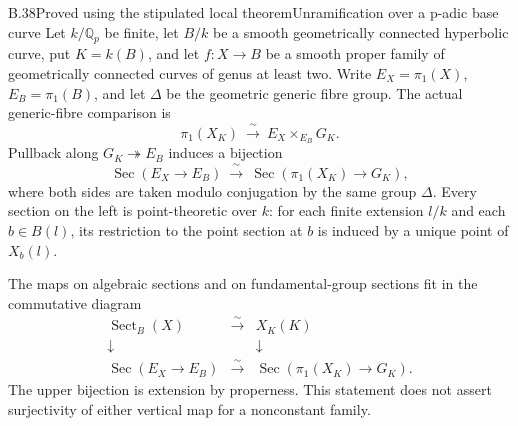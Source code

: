 \begin{statement}{B.38}{Proved using the stipulated local theorem}{Unramification over a p-adic base curve}
Let $k/\mathbb Q_p$ be finite, let $B/k$ be a smooth
geometrically connected hyperbolic curve, put $K=k(B)$,
and let $f:X\to B$ be a smooth proper family of
geometrically connected curves of genus at least two.
Write $E_X=\pi_1(X)$, $E_B=\pi_1(B)$, and let $\Delta$
be the geometric generic fibre group. The actual
generic-fibre comparison is
\[
 \pi_1(X_K)\ \xrightarrow{\ \sim\ }\
 E_X\times_{E_B}G_K.
 \tag{B.38.1}
\]
Pullback along $G_K\twoheadrightarrow E_B$ induces a
bijection
\[
 \operatorname{Sec}(E_X\to E_B)
 \ \xrightarrow{\ \sim\ }\
 \operatorname{Sec}(\pi_1(X_K)\to G_K),
 \tag{B.38.2}
\]
where both sides are taken modulo conjugation by the
same group $\Delta$. Every section on the left is
point-theoretic over $k$: for each finite extension
$l/k$ and each $b\in B(l)$, its restriction to the
point section at $b$ is induced by a unique point of
$X_b(l)$.

The maps on algebraic sections and on fundamental-group
sections fit in the commutative diagram
\[
\begin{array}{ccc}
 \operatorname{Sect}_B(X)&\xrightarrow{\sim}&X_K(K)\\
 \downarrow&&\downarrow\\
 \operatorname{Sec}(E_X\to E_B)&\xrightarrow{\sim}&
       \operatorname{Sec}(\pi_1(X_K)\to G_K).
\end{array}
\tag{B.38.3}
\]
The upper bijection is extension by properness. This
statement does not assert surjectivity of either
vertical map for a nonconstant family.
\end{statement}
